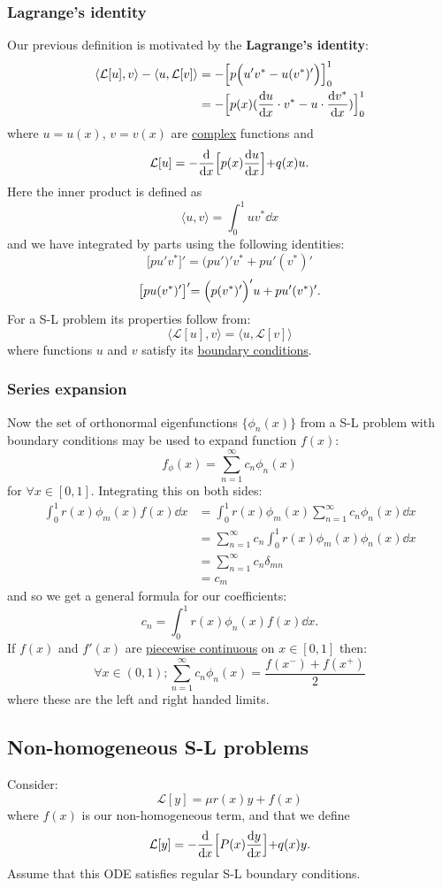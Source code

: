 \documentclass{article}
\begin{document}
\subsubsection{Lagrange's identity}
Our previous definition is motivated by the \textbf{Lagrange's identity}:
\begin{align*}
    \langle \mathcal{L}[u], v \rangle - \langle u, \mathcal{L}[v] \rangle
    &=-\Bigl[p\Bigl(u'v^*-u(v^*)'\Bigl)\Bigl]_{0}^{1} \\
    &=-\Bigl[p(x)(\dv{u}{x}\cdot v^*-u\cdot\dv{v^*}{x})\Bigl]_{0}^{1}
\end{align*}
where $u=u(x)$, $v=v(x)$ are \underline{complex} functions and
$$\mathcal{L}[u]=-\dv{x}\Bigl[p(x)\dv{u}{x}\Bigl]+q(x)u.$$
Here the inner product is defined as
$$\langle u,v \rangle=\int_{0}^{1}uv^* \dd x$$
and we have integrated by parts using the following identities:
$$\bigl[pu'v^*\bigl]'=\bigl(pu'\bigl)'v^*+pu'(v^*)'$$
$$\bigl[pu(v^*)'\bigl]'=\Bigl(p(v^*)'\Bigl)'u+pu'(v^*)'.$$
For a S-L problem its properties follow from:
$$\langle \mathcal{L}[u], v \rangle=\langle u, \mathcal{L}[v] \rangle$$
where functions $u$ and $v$
satisfy its \underline{boundary conditions}.

\newpage

\subsubsection{Series expansion}
Now the set of orthonormal eigenfunctions $\{\phi_n(x)\}$
from a S-L problem with boundary conditions
may be used to expand function $f(x)$:
$$f_\phi(x)=\sum_{n=1}^{\infty} c_n\phi_n(x)$$
for $\forall x\in[0,1]$. Integrating this on both sides:
\begin{align*}
    \int_{0}^{1}r(x)\phi_m(x)f(x)\dd x
    &=\int_{0}^{1}r(x)\phi_m(x)
    \sum_{n=1}^{\infty} c_n\phi_n(x)\dd x \\
    &=\sum_{n=1}^{\infty} c_n
    \int_{0}^{1}r(x)\phi_m(x)\phi_n(x)\dd x \\
    &=\sum_{n=1}^{\infty} c_n\delta_{mn} \\
    &=c_m
\end{align*}
and so we get a general formula for our coefficients:
$$c_n=\int_{0}^{1}r(x)\phi_n(x)f(x)\dd x.$$
If $f(x)$ and $f'(x)$ are \underline{piecewise continuous}
on $x\in[0,1]$ then:
$$\forall x\in(0,1);\sum_{n=1}^{\infty} c_n\phi_n(x)
=\frac{f(x^-)+f(x^+)}{2}$$
where these are the left and right handed limits.

\newpage

\subsection{Non-homogeneous S-L problems}
Consider:
$$\mathcal{L}[y]=\mu r(x)y+f(x)$$
where $f(x)$ is our non-homogeneous term, and that we define
$$\mathcal{L}[y]=-\dv{x}\Bigl[P(x)\dv{y}{x}\Bigl]+q(x)y.$$
Assume that this ODE satisfies regular S-L boundary conditions.
\end{document}
